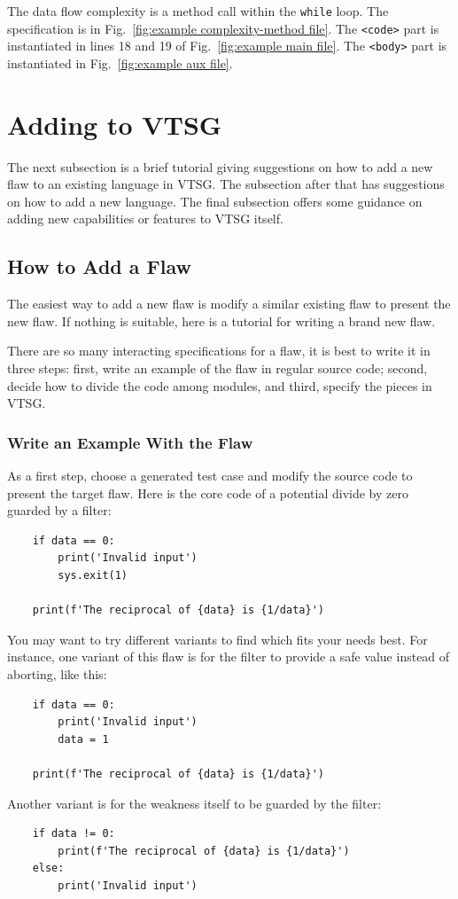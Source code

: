\documentclass[12pt]{article}
\begin{document}
The data flow complexity is a method call within the \verb|while| loop.  
The specification
is in Fig.~\ref{fig:example complexity-method file}.  
The \verb|<code>|
part is instantiated in lines 18 and 19 of 
Fig.~\ref{fig:example main file}. 
The \verb|<body>| part is instantiated in
Fig.~\ref{fig:example aux file}.


\section{Adding to VTSG}

The next subsection is a brief tutorial giving suggestions on how to add a new
flaw to an existing language in VTSG.  The subsection after that has suggestions
on how to add a new language.  The final subsection offers some guidance on
adding new capabilities or features to VTSG itself.

\subsection{How to Add a Flaw}

The easiest way to add a new flaw is modify a similar existing flaw to present the
new flaw.  If nothing is suitable, here is a tutorial for writing a brand new flaw.

There are so many interacting specifications for a flaw, it is best to write it in
three steps: first, write an example of the flaw in regular source code; second,
decide how to
divide the code among modules, and third, specify the pieces in VTSG.

\subsubsection{Write an Example With the Flaw}

As a first step, choose a generated test case and modify the source code to present
the target flaw.  Here is the core code of
a potential divide by zero guarded by a filter:
\begin{verbatim}
    if data == 0:
        print('Invalid input')
        sys.exit(1)

    print(f'The reciprocal of {data} is {1/data}')
\end{verbatim}
You may want to try different variants to find which fits your needs best.  For
instance, one variant of this flaw is for the filter to provide a safe value instead
of aborting, like this:
\begin{verbatim}
    if data == 0:
        print('Invalid input')
        data = 1

    print(f'The reciprocal of {data} is {1/data}')
\end{verbatim}
Another variant is for the weakness itself to be guarded by the filter:
\begin{verbatim}
    if data != 0:
        print(f'The reciprocal of {data} is {1/data}')
    else:
        print('Invalid input')
\end{verbatim}
\end{document}
